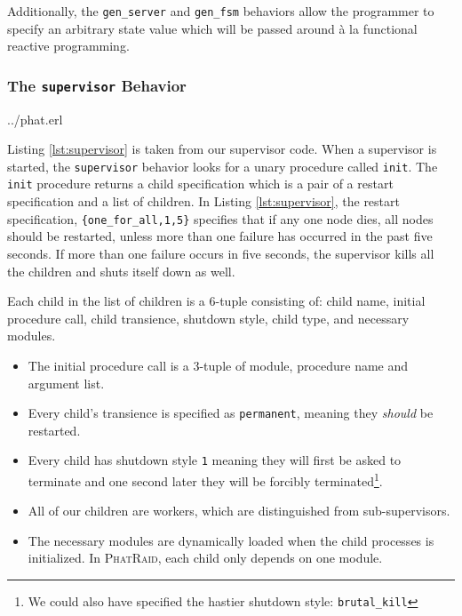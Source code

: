 \documentclass[10pt,letter]{article}
\newcommand{\phatraid}[0]{\textsc{PhatRaid}}
\begin{document}
Additionally, the \texttt{gen\_server} and \texttt{gen\_fsm} behaviors allow
the programmer to specify an arbitrary state value which will be passed around
\`{a} la functional reactive programming.

\subsubsection{The \texttt{supervisor} Behavior}


                {../phat.erl}

Listing \ref{lst:supervisor} is taken from our supervisor code. When a
supervisor is started, the \texttt{supervisor} behavior looks for a unary
procedure called \lstinline!init!. The \lstinline!init! procedure returns a
child specification which is a pair of a restart specification and a list of
children. In Listing \ref{lst:supervisor}, the restart specification,
\lstinline!{one_for_all,1,5}! specifies that if any one node dies, all nodes
should be restarted, unless more than one failure has occurred in the past five
seconds. If more than one failure occurs in five seconds, the supervisor kills
all the children and shuts itself down as well.

Each child in the list of children is a 6-tuple consisting of: child name,
initial procedure call, child transience, shutdown style, child type, and
necessary modules.

\begin{itemize}
\item The initial procedure call is a 3-tuple of module, procedure name and
  argument list.
\item Every child's transience is specified as \lstinline!permanent!, meaning
  they \emph{should} be restarted.
\item Every child has shutdown style \lstinline!1! meaning they will first be
  asked to terminate and one second later they will be forcibly
  terminated\footnote{We could also have specified the hastier shutdown style:
    \lstinline!brutal_kill!}.
\item All of our children are workers, which are distinguished from
  sub-supervisors.
\item The necessary modules are dynamically loaded when the child processes is
  initialized. In \phatraid{}, each child only depends on one module.
\end{itemize}
\end{document}
